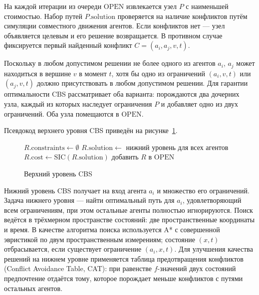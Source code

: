 На каждой итерации из очереди $\mathrm{OPEN}$ извлекается узел $P$ с наименьшей стоимостью.
Набор путей $P.\mathrm{solution}$ проверяется на наличие конфликтов путём симуляции совместного
движения агентов. Если конфликтов нет --- узел объявляется целевым и его решение возвращается.
В противном случае фиксируется первый найденный конфликт $C = (a_i, a_j, v, t)$.

Поскольку в любом допустимом решении не более одного из агентов $a_i$, $a_j$ может находиться в
вершине $v$ в момент $t$, хотя бы одно из ограничений $(a_i, v, t)$ или $(a_j, v, t)$ должно
присутствовать в любом допустимом решении. Для гарантии оптимальности CBS рассматривает оба варианта:
порождаются два дочерних узла, каждый из которых наследует ограничения $P$ и добавляет одно из двух
ограничений. Оба узла помещаются в $\mathrm{OPEN}$.

Псевдокод верхнего уровня CBS приведён на рисунке~\ref{alg:cbs-high}.

\begin{figure}
\begin{minipage}{\linewidth}
\begin{algorithm}[H]
    \SetAlgoVlined
    $R.\mathrm{constraints} \leftarrow \emptyset$\;
    $R.\mathrm{solution} \leftarrow$ нижний уровень для всех агентов\;
    $R.\mathrm{cost} \leftarrow \mathrm{SIC}(R.\mathrm{solution})$\;
    добавить $R$ в $\mathrm{OPEN}$\;
\end{algorithm}
\end{minipage}
\caption{Верхний уровень CBS}
\label{alg:cbs-high}
\end{figure}

Нижний уровень CBS получает на вход агента $a_i$ и множество его ограничений. Задача нижнего уровня ---
найти оптимальный путь для $a_i$, удовлетворяющий всем ограничениям, при этом остальные агенты
полностью игнорируются. Поиск ведётся в трёхмерном пространстве состояний: две пространственные
координаты и время. В качестве алгоритма поиска используется A* с совершенной эвристикой по двум
пространственным измерениям; состояние $(x, t)$ отбрасывается, если существует ограничение $(a_i, x, t)$.
Для улучшения качества решений на нижнем уровне применяется таблица предотвращения конфликтов
(Conflict Avoidance Table, CAT): при равенстве $f$-значений двух состояний предпочтение отдаётся
тому, которое порождает меньше конфликтов с путями остальных агентов.

